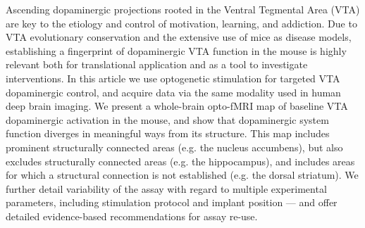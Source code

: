 Ascending dopaminergic projections rooted in the Ventral Tegmental Area (VTA) are key to the etiology and control of motivation, learning, and addiction.
Due to VTA evolutionary conservation and the extensive use of mice as disease models, establishing a fingerprint of dopaminergic VTA function in the mouse is highly relevant both for translational application and as a tool to investigate interventions.
In this article we use optogenetic stimulation for targeted VTA dopaminergic control, and acquire data via the same modality used in human deep brain imaging.
We present a whole-brain opto-fMRI map of baseline VTA dopaminergic activation in the mouse, and show that dopaminergic system function diverges in meaningful ways from its structure.
This map includes prominent structurally connected areas (e.g. the nucleus accumbens), but also excludes structurally connected areas (e.g. the hippocampus), and includes areas for which a structural connection is not established (e.g. the dorsal striatum).
We further detail variability of the assay with regard to multiple experimental parameters, including stimulation protocol and implant position --- and offer detailed evidence-based recommendations for assay re-use.
